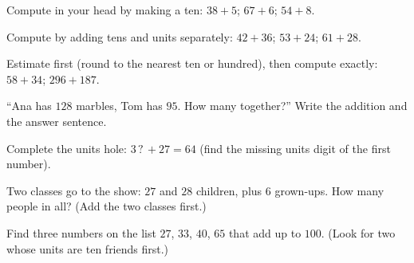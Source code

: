 \begin{exercise}[$\star$]\label{exo:g2:addition:4}
Compute in your head by making a ten: $38 + 5$; \quad $67 + 6$;
\quad $54 + 8$.
\end{exercise}

\begin{exercise}[$\star$]\label{exo:g2:addition:5}
Compute by adding tens and units separately: $42 + 36$; \quad
$53 + 24$; \quad $61 + 28$.
\end{exercise}

\begin{exercise}[$\star$]\label{exo:g2:addition:6}
Estimate first (round to the nearest ten or hundred), then compute
exactly: $58 + 34$; \quad $296 + 187$.
\end{exercise}

\begin{exercise}[$\star$]\label{exo:g2:addition:7}
``Ana has $128$ marbles, Tom has $95$. How many together?'' Write
the addition and the answer sentence.
\end{exercise}

\begin{exercise}[$\star$]\label{exo:g2:addition:8}
Complete the units hole: $3\,?\, + 27 = 64$ (find the missing units
digit of the first number).
\end{exercise}

\begin{exercise}[$\star$]\label{exo:g2:addition:9}
Two classes go to the show: $27$ and $28$ children, plus $6$
grown-ups. How many people in all? (Add the two classes first.)
\end{exercise}

\begin{exercise}[$\star\star$]\label{exo:g2:addition:10}
Find three numbers on the list $27$, $33$, $40$, $65$ that add up
to $100$. (Look for two whose units are ten friends first.)
\end{exercise}
